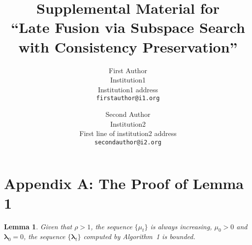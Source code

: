 \documentclass[10pt,twocolumn,letterpaper]{article}
\newtheorem{lemma}{Lemma}
\def\blambda{{\bm \lambda}}
\begin{document}
\title{Supplemental Material for \\``Late Fusion via Subspace Search with Consistency Preservation''}
\author{First Author\\
Institution1\\
Institution1 address\\
{\tt\small firstauthor@i1.org}
\and
Second Author\\
Institution2\\
First line of institution2 address\\
{\tt\small secondauthor@i2.org}
}

\maketitle



\section{Appendix A: The Proof of Lemma 1}

\begin{lemma}
Given that $\rho > 1$, the sequence $\{ \mu_{t} \}$ is always increasing, $\mu_{0} > 0$ and $\blambda_{0} = 0$, the sequence $\{ \blambda_{t} \}$ computed by Algorithm~1 is bounded.
\end{lemma}
\end{document}

